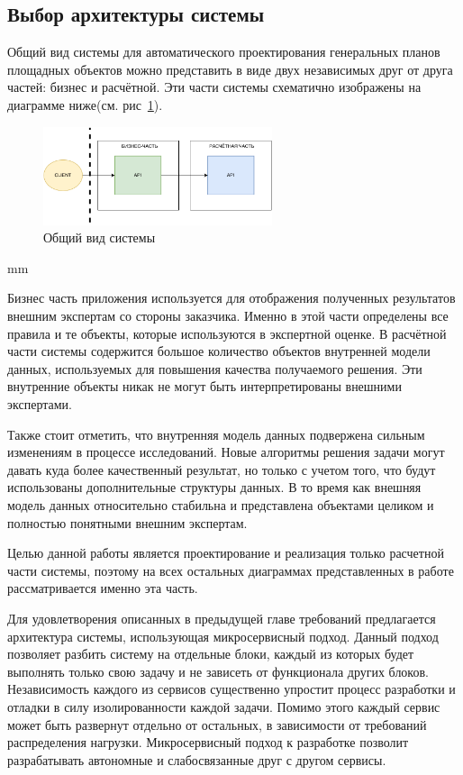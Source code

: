 \subsection*{\large{Выбор архитектуры системы}}

Общий вид системы для автоматического проектирования генеральных планов площадных объектов можно представить в виде
двух независимых друг от друга частей: бизнес и расчётной.
Эти части системы схематично изображены на диаграмме ниже(см. рис\ \ref{pic:architecture__system-diagram}).

\begin{figure}[H]
	\hspace*{-2.5 cm}\includegraphics[width=0.6\textwidth, left]{architecture/pictures/common/system}
	\caption{Общий вид системы}
	\label{pic:architecture__system-diagram}
\end{figure}
 mm

Бизнес часть приложения используется для отображения полученных результатов внешним экспертам со стороны заказчика.
Именно в этой части определены все правила и те объекты, которые используются в экспертной оценке.
В расчётной части системы содержится большое количество объектов внутренней модели данных, используемых для повышения
качества получаемого решения. Эти внутренние объекты никак не могут быть интерпретированы внешними экспертами.

Также стоит отметить, что внутренняя модель данных подвержена сильным изменениям в процессе исследований.
Новые алгоритмы решения задачи могут давать куда более качественный результат, но только с учетом того, что
будут использованы дополнительные структуры данных. В то время как внешняя модель данных относительно стабильна
и представлена объектами целиком и полностью понятными внешним экспертам.

Целью данной работы является проектирование и реализация только расчетной части системы, поэтому на всех остальных
диаграммах представленных в работе рассматривается именно эта часть.

Для удовлетворения описанных в предыдущей главе требований предлагается архитектура системы,
использующая микросервисный подход. Данный подход позволяет разбить систему на отдельные блоки,
каждый из которых будет выполнять только свою задачу и не зависеть от функционала других блоков.
Независимость каждого из сервисов существенно упростит процесс разработки и отладки в силу изолированности
каждой задачи. Помимо этого каждый сервис может быть развернут отдельно от остальных, в зависимости
от требований распределения нагрузки. Микросервисный подход к разработке позволит разрабатывать
автономные и слабосвязанные друг с другом сервисы.

